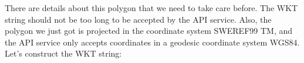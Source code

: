 \documentclass[
  10pt,
]{article}
\newenvironment{Shaded}{\begin{snugshade}}{\end{snugshade}}
\newcommand{\AttributeTok}[1]{\textcolor[rgb]{0.77,0.63,0.00}{#1}}
\newcommand{\FunctionTok}[1]{\textcolor[rgb]{0.00,0.00,0.00}{#1}}
\newcommand{\NormalTok}[1]{#1}
\newcommand{\OtherTok}[1]{\textcolor[rgb]{0.56,0.35,0.01}{#1}}
\newcommand{\SpecialCharTok}[1]{\textcolor[rgb]{0.00,0.00,0.00}{#1}}
\newcommand{\StringTok}[1]{\textcolor[rgb]{0.31,0.60,0.02}{#1}}
\begin{document}
\begin{Shaded}
\end{Shaded}

There are details about this polygon that we need to take care before. The WKT
string should not be too long to be accepted by the API service. Also, the polygon
we just got is projected in the coordinate system SWEREF99 TM, and the API service
only accepts coordinates in a geodesic coordinate system WGS84. Let's construct
the WKT string:
\end{document}
